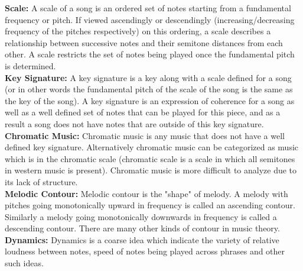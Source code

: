 \noindent \textbf{Scale:} A scale of a song is an ordered set of notes starting from a fundamental frequency or pitch. If viewed ascendingly or descendingly (increasing/decreasing frequency of the pitches respectively) on this ordering, a scale describes a relationship between successive notes and their semitone distances from each other. A scale restricts the set of notes being played once the fundamental pitch is determined. \\

\noindent \textbf{Key Signature:} A key signature is a key along with a scale defined for a song (or in other words the fundamental pitch of the scale of the song is the same as the key of the song). A key signature is an expression of coherence for a song as well as a well defined set of notes that can be played for this piece, and as a result a song does not have notes that are outside of this key signature. \\

\noindent \textbf{Chromatic Music:} Chromatic music is any music that does not have a well defined key signature. Alternatively chromatic music can be categorized as music which is in the chromatic scale (chromatic scale is a scale in which all semitones in western music is present). Chromatic music is more difficult to analyze due to its lack of structure. \\

\noindent \textbf{Melodic Contour:} Melodic contour is the "shape" of melody. A melody with pitches going monotonically upward in frequency is called an ascending contour. Similarly a melody going monotonically downwards in frequency is called a descending contour. There are many other kinds of contour in music theory. \\

\noindent \textbf{Dynamics:} Dynamics is a coarse idea which indicate the variety of relative loudness between notes, speed of notes being played across phrases and other such ideas. 
